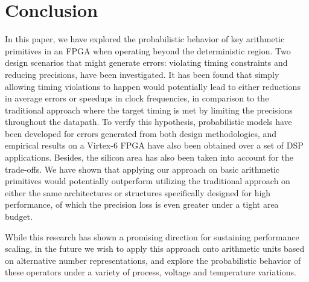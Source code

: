 \documentclass[prodmode,acmtrets]{acmsmall} %
\begin{document}
\section{Conclusion}  \label{Section_Conclusion}
In this paper, we have explored the probabilistic behavior of key arithmetic primitives in an FPGA when operating beyond the deterministic region. Two design scenarios that might generate errors: violating timing constraints and reducing precisions, have been investigated. It has been found that simply allowing timing violations to happen would potentially lead to either reductions in average errors or speedups in clock frequencies, in comparison to the traditional approach where the target timing is met by limiting the precisions throughout the datapath. To verify this hypothesis, probabilistic models have been developed for errors generated from both design methodologies, and empirical results on a Virtex-6 FPGA have also been obtained over a set of DSP applications. Besides, the silicon area has also been taken into account for the trade-offs. We have shown that applying our approach on basic arithmetic primitives would potentially outperform utilizing the traditional approach on either the same architectures or structures specifically designed for high performance, of which the precision loss is even greater under a tight area budget.

While this research has shown a promising direction for sustaining performance scaling, in the future we wish to apply this approach onto arithmetic units based on alternative number representations, and explore the probabilistic behavior of these operators under a variety of process, voltage and temperature variations.


\end{document}
